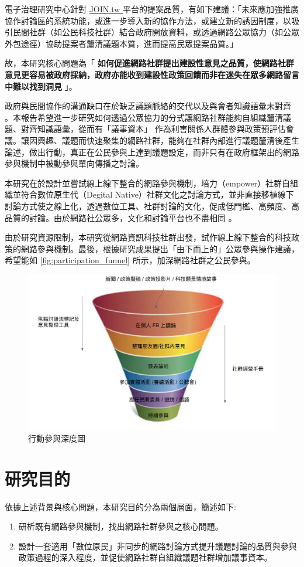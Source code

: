 \documentclass[12pt,a4paper]{article}
\begin{document}
電子治理研究中心針對 \href{https://join.gov.tw}{JOIN.tw }平台的提案品質，有如下建議：「未來應加強推廣協作討論區的系統功能，或進一步導入新的協作方法，或建立新的誘因制度，以吸引民間社群（如公民科技社群）結合政府開放資料，或透過網路公眾協力（如公眾外包途徑）協助提案者釐清議題本質，進而提高民眾提案品質。」\cite{liao18}

故，本研究核心問題為「 \textbf{如何促進網路社群提出建設性意見之品質，使網路社群意見更容易被政府採納，政府亦能收到建設性政策回饋而非在迷失在眾多網路留言中難以找到洞見} 」。

政府與民間協作的溝通缺口在於缺乏議題脈絡的交代以及與會者知識語彙未對齊 \citep{alberttzeng08} 。本報告希望進一步研究如何透過公眾協力的分式讓網路社群能夠自組織釐清議題、對齊知識語彙，從而有「議事資本」 作為利害關係人群體參與政策預評估會議。讓因興趣、議題而快速聚集的網路社群，能夠在社群內部進行議題釐清後產生論述，做出行動，真正在公民參與上達到議題設定，而非只有在政府框架出的網路參與機制中被動參與單向傳播之討論。

本研究在於設計並嘗試線上線下整合的網路參與機制，培力（empower）社群自組織並符合數位原生代（Degital Native）社群文化之討論方式，並非直接移植線下討論方式使之線上化，透過數位工具、社群討論的文化，促成低門檻、高頻度、高品質的討論。由於網路社公眾多，文化和討論平台也不盡相同 。

由於研究資源限制，本研究從網路資訊科技社群出發，試作線上線下整合的科技政策的網路參與機制。最後，根據研究成果提出「由下而上的」公眾參與操作建議，希望能如 \ref{fig:participation_funnel} 所示，加深網路社群之公民參與。

\begin{figure}[htbp]
\centering
\includegraphics[width=.9\linewidth]{./images/participation_funnel.png}
\caption{\label{fig:org6ffc349}
行動參與深度圖}
\end{figure}
\section{研究目的}
\label{sec:orgaf57673}
依據上述背景與核心問題，本研究目的分為兩個層面，簡述如下:
\begin{enumerate}
\item 研析既有網路參與機制，找出網路社群參與之核心問題。
\item 設計一套適用「數位原民」非同步的網路討論方式提升議題討論的品質與參與政策過程的深入程度，並促使網路社群自組織議題社群增加議事資本。
\end{enumerate}
\end{document}
